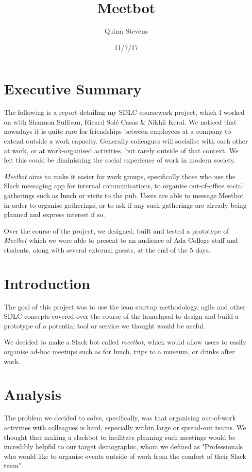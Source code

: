 \documentclass[12pt]{report}
\author{Quinn Stevens}
\title{Meetbot}
\date{11/7/17}
\begin{document}
\maketitle
\section*{Executive Summary}
The following is a report detailing my SDLC coursework project, which I worked on with Shannon Sullivan, Ricard Sol\'e Casas \& Nikhil Kerai. We noticed that nowadays it is quite rare for friendships between employees at a company to extend outside a work capacity. Generally colleagues will socialise with each other at work, or at work-organised activities, but rarely outside of that context. We felt this could be diminishing the social experience of work in modern society.

\vspace{3mm}

\emph{Meetbot} aims to make it easier for work groups, specifically those who use the Slack messaging app for internal communications, to organise out-of-office social gatherings such as lunch or visits to the pub. Users are able to message Meetbot in order to organise gatherings, or to ask if any such gatherings are already being planned and express interest if so.

\vspace{3mm}

Over the course of the project, we designed, built and tested a prototype of \emph{Meetbot} which we were able to present to an audience of Ada College staff and students, along with several external guests, at the end of the 5 days.
\tableofcontents

\section{Introduction}
The goal of this project was to use the lean startup methodology, agile and other SDLC concepts covered over the course of the launchpad to design and build a prototype of a potential tool or service we thought would be useful.

We decided to make a Slack bot called \emph{meetbot}, which would allow users to easily organise ad-hoc meetups such as for lunch, trips to a museum, or drinks after work.

\section{Analysis}
The problem we decided to solve, specifically, was that organising out-of-work activities with colleagues is hard, especially within large or spread-out teams. We thought that making a slackbot to facilitate planning such meetings would be incredibly helpful to our target demographic, whom we defined as "Professionals who would like to organise events outside of work from the comfort of their Slack team".
\end{document}
